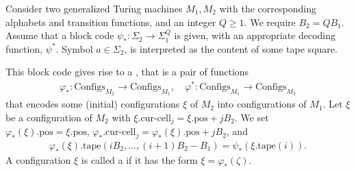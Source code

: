 \documentclass[11pt]{memoir}
\theoremstyle{definition} %
\renewcommand{\ge}{\geq}
\def\B{B}
\newcommand{\Configs}{\mathrm{Configs}}
\newcommand{\pos}{\mathrm{pos}}
\newcommand{\curcell}{\textrm{cur-cell}}
\newcommand{\Q}{Q}
\newcommand{\tape}{\mathrm{tape}}
\begin{document}
\begin{definition}\label{def:configuration-code}
\begin{sloppypar}
 Consider two generalized Turing machines \( M_{1},M_{2} \) with the corresponding
alphabets and transition functions, and an integer \( \Q\ge 1 \).
We require \(   \B_{2} = \Q \B_{1} \).
Assume that a block code
\(
   \psi_{*}:\Sigma_{2}\to\Sigma_{1}^{\Q}
\)
is given, with an appropriate decoding function, \( \psi^{*} \).
Symbol \( a\in\Sigma_{2} \), is interpreted as the content of some tape square.
\end{sloppypar}

This block code gives rise to a , that is a pair of functions
    \begin{align*}
        \varphi_{*} :\Configs_{M_{2}} \to \Configs_{M_{1}},
        \quad
        \varphi^{*}:\Configs_{M_{1}} \to \Configs_{M_{2}}
    \end{align*}
    that encodes some (initial) configurations \( \xi \) of \( M_{2} \) into configurations of \( M_{1} \).
    Let \( \xi \) be a configuration of \( M_{2} \) with \( \xi.\curcell_{j}=\xi.\pos+j\B_{2} \).
    We set \( \varphi_{*}(\xi).\pos = \xi.\pos \),
    \( \varphi_{*}.\curcell_{j}= \varphi_{*}(\xi).\pos+j\B_{2} \),
  and
\begin{align*}
 \varphi_{*}(\xi).\tape(i\B_{2}, \dots, (i+1)\B_{2} - \B_{1}) = \psi_{*}(\xi.\tape(i)).
 \end{align*}
A configuration \( \xi \) is called a  if it has the form \( \xi=\varphi_{*}(\zeta) \).
 \end{definition}
\end{document}
